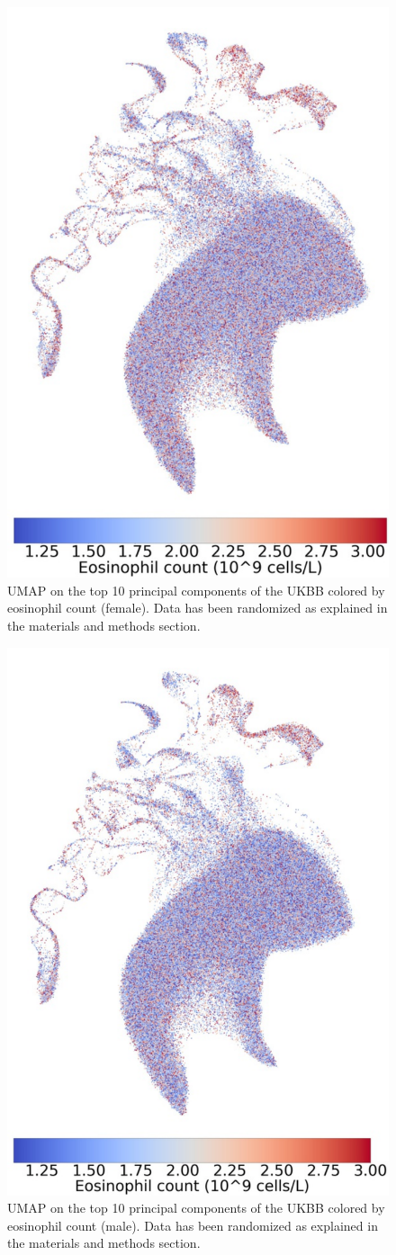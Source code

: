 \documentclass[12pt]{pnas-new}
\begin{document}
\begin{figure}
    \centering
    \includegraphics[width=0.4\columnwidth]{images/UKBB_UMAP_PC10_NN15_MD05_2018328174511_201871417720_eosinophill_count_pct5_f.pdf}
    \caption{UMAP on the top 10 principal components of the UKBB colored by eosinophil count (female). Data has been randomized as explained in the materials and methods section.}
    \label{fig:supp_ukbb_eosinophill_f}
\end{figure}

\begin{figure}
    \centering
    \includegraphics[width=0.4\columnwidth]{images/UKBB_UMAP_PC10_NN15_MD05_2018328174511_201871417720_eosinophill_count_pct5_m.pdf}
    \caption{UMAP on the top 10 principal components of the UKBB colored by eosinophil count (male). Data has been randomized as explained in the materials and methods section.}
    \label{fig:supp_ukbb_eosinophill_m}
\end{figure}
\end{document}
